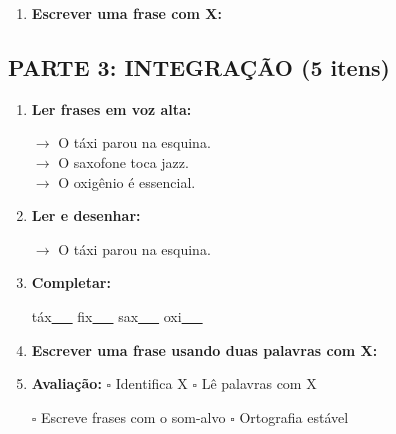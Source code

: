 \begin{exercicio}
\begin{enumerate}[resume]
  \item \textbf{Escrever uma frase com X:}
  \begin{center}
  \underline{\hspace{12cm}}
  \end{center}

\end{enumerate}

\subsection*{PARTE 3: INTEGRAÇÃO (5 itens)}

\begin{enumerate}[resume]

  \item \textbf{Ler frases em voz alta:}
  \begin{center}
  $\rightarrow$ O táxi parou na esquina.\\
  $\rightarrow$ O saxofone toca jazz.\\
  $\rightarrow$ O oxigênio é essencial.\\
  \end{center}

  \item \textbf{Ler e desenhar:}
  \begin{center}
  $\rightarrow$ O táxi parou na esquina.
  \end{center}
  \begin{center}
  \end{center}

  \item \textbf{Completar:}
  \begin{center}
  táx\underline{~~~} \quad fix\underline{~~~} \quad sax\underline{~~~} \quad oxi\underline{~~~}
  \end{center}

  \item \textbf{Escrever uma frase usando duas palavras com X:}
  \begin{center}
  \underline{\hspace{12cm}}
  \end{center}

  \item \textbf{Avaliação:} $\square$ Identifica X \quad $\square$ Lê palavras com X
  \begin{center}
  $\square$ Escreve frases com o som-alvo \quad $\square$ Ortografia estável
  \end{center}


\end{enumerate}
\end{exercicio}
